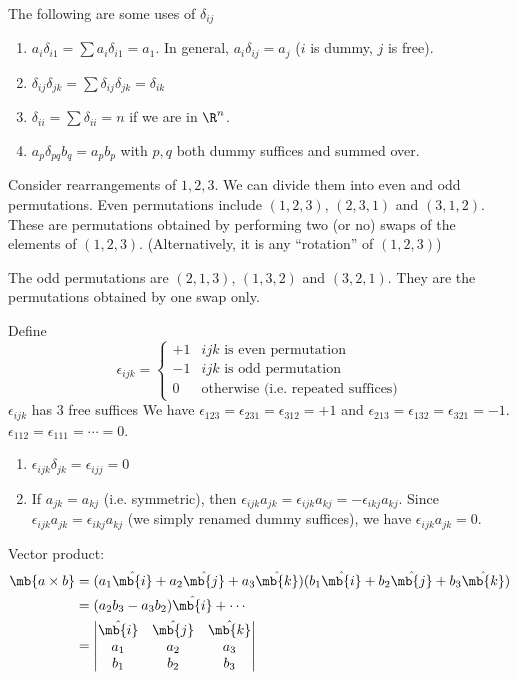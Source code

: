\documentclass[a4paper]{article}
\begin{document}
\begin{eg}
  The following are some uses of $\delta_{ij}$
  \begin{enumerate}
  \item $a_i\delta_{i1} = \sum a_i\delta_{i1} = a_1$. In general, $a_i\delta_{ij} = a_j$ ($i$ is dummy, $j$ is free).
  \item $\delta_{ij}\delta_{jk} = \sum\delta_{ij}\delta_{jk} = \delta_{ik}$
  \item $\delta_{ii} = \sum \delta_{ii} = n$ if we are in $\R^n$.
  \item $a_p\delta_{pq}b_q = a_pb_p$ with $p, q$ both dummy suffices and summed over.
  \end{enumerate}
\end{eg}

\begin{defi}
  Consider rearrangements of $1, 2, 3$. We can divide them into even and odd permutations. Even permutations include $(1, 2, 3)$, $(2, 3, 1)$ and $(3, 1, 2)$. These are permutations obtained by performing two (or no) swaps of the elements of $(1, 2, 3)$. (Alternatively, it is any ``rotation'' of $(1, 2, 3)$)

  The odd permutations are $(2, 1, 3)$, $(1, 3, 2)$ and $(3, 2, 1)$. They are the permutations obtained by one swap only.

  Define
  \[
  \epsilon_{ijk} =
  \begin{cases}
    +1 & ijk \text{ is even permutation}\\
    -1 & ijk\text{ is odd permutation}\\
    0 & \text{otherwise (i.e. repeated suffices)}
  \end{cases}
  \]
  $\epsilon_{ijk}$ has 3 free suffices
 We have $\epsilon_{123} = \epsilon_{231} = \epsilon_{312} = +1$ and $\epsilon_{213} = \epsilon_{132} = \epsilon_{321} = -1$. $\epsilon_{112} = \epsilon_{111} = \cdots = 0$.
\end{defi}
\note
\begin{enumerate}
\item $\epsilon_{ijk}\delta_{jk} = \epsilon_{ijj} = 0$
\item If $a_{jk} = a_{kj}$ (i.e. symmetric), then $\epsilon_{ijk}a_{jk} = \epsilon_{ijk}a_{kj} = -\epsilon_{ikj}a_{kj}$. Since $\epsilon_{ijk}a_{jk} = \epsilon_{ikj}a_{kj}$ (we simply renamed dummy suffices), we have $\epsilon_{ijk}a_{jk} = 0$.
\end{enumerate}

Vector product:
\begin{align*}
\mb{a\times b} &= (a_1\hat{\mb{i}} + a_2\hat{\mb{j}} + a_3\hat{\mb{k}})(b_1\hat{\mb{i}} + b_2\hat{\mb{j}} + b_3\hat{\mb{k}})\\
&= (a_2b_3 - a_3b_2)\hat{\mb{i}} + \cdots\\
&= \begin{vmatrix} \hat{\mb{i}} & \hat{\mb{j}} & \hat{\mb{k}}\\
  a_1 & a_2 & a_3\\
  b_1 & b_2 & b_3\\
\end{vmatrix}
\end{align*}
\end{document}
